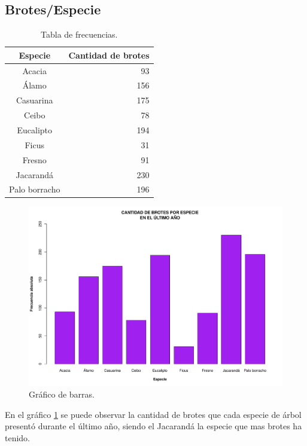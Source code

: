\documentclass[11pt]{article}
\begin{document}

\newpage
\subsection{Brotes/Especie}

\begin{table}[h!]
  \begin{center}
    \begin{tabular}{| c | r |}
      \hline
      \textbf{Especie} & \textbf{Cantidad de brotes} \\ \hline
      Acacia & 93 \\ \hline
      Álamo & 156 \\ \hline
      Casuarina & 175 \\ \hline
      Ceibo & 78 \\ \hline
      Eucalipto & 194 \\ \hline
      Ficus & 31 \\ \hline
      Fresno & 91 \\ \hline
      Jacarandá & 230 \\ \hline
      Palo borracho & 196 \\ \hline
    \end{tabular}
  \caption{Tabla de frecuencias.}
  \label{tab:tablaBrotesEspecie}
  \end{center}
\end{table}

\begin{figure}[h!]
  \begin{center}
    \includegraphics[width=0.9\linewidth]{barrasBrotesEspecie.pdf}
    \caption{Gráfico de barras.}
    \label{fig:barrasBrotesEspecie}
  \end{center}  
\end{figure}

\begin{justify}
  En el gráfico \ref{fig:barrasBrotesEspecie} se puede observar la cantidad
  de brotes que cada especie de árbol presentó durante el último año, siendo
  el Jacarandá la especie que mas brotes ha tenido.
\end{justify}
\end{document}

